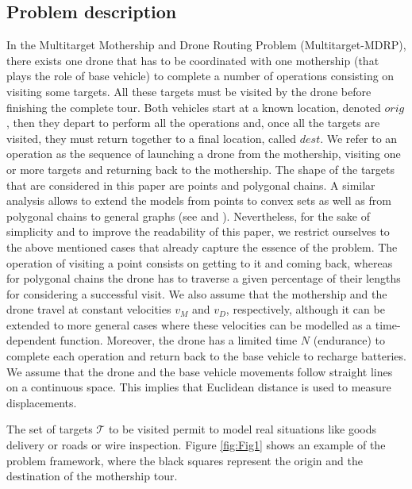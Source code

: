 \documentclass{itor}
\theoremstyle{definition}
\theoremstyle{remark}
\def\AMD{{\sf Multitarget-MDRP\xspace}}
\begin{document}
\subsection{Problem description}\label{subsection:desc}
In the Multitarget Mothership and Drone Routing Problem (\AMD), there exists one drone that has to be coordinated with one mothership (that plays the role of base vehicle) to complete a number of operations consisting on visiting some targets. All these targets must be visited by the drone before finishing the complete tour. Both vehicles start at a known location, denoted $orig$, then they depart to perform all the operations and, once all the targets are visited, they must return together to a final location, called $dest$. We refer to an operation as the sequence of launching a drone from the mothership, visiting one or more targets and returning back to the mothership. The shape of the targets that are considered in this paper are points and polygonal chains. A similar analysis allows to extend the models from points to convex sets as well as from polygonal chains to general graphs (see \cite{art:Amorosi2021} and \cite{art:Amorosi2021b}). Nevertheless, for the sake of simplicity and to improve the readability of this paper, we restrict ourselves to the above mentioned cases that already capture the essence of the problem. The operation of visiting a point consists on getting to it and coming back, whereas for polygonal chains the drone has to traverse a given percentage of their lengths for considering a successful visit. We also assume that the mothership and the drone travel at constant velocities $v_M$ and $v_D$, respectively, although it can be extended to more general cases where these velocities can be modelled as a time-dependent function. Moreover, the drone has a limited time $N$ (endurance) to complete each operation and return back to the base vehicle to recharge batteries. We assume that the drone and the base vehicle movements follow straight lines on a continuous space. This implies that Euclidean distance is used to measure displacements.


The set of targets $\mathcal{T}$ to be visited permit to model real situations like goods delivery or roads or wire inspection. Figure \ref{fig:Fig1} shows an example of the problem framework, where the black squares represent the origin and the destination of the mothership tour. 

\end{document}

